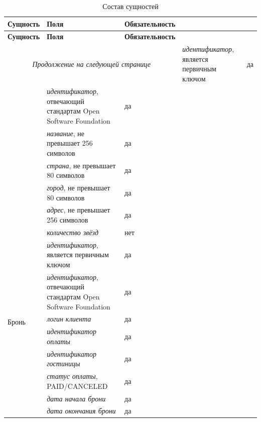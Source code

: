 \begin{longtable}{| p{4cm} | p{8.3cm} | p{3.6cm} |}
	\caption{Состав сущностей}
	\label{tbl:db_reservation} \\
	\hline
	
	\textbf{Сущность} & \textbf{Поля} & \textbf{Обязательность} \\
	\hline
	\endfirsthead
	
	\hline
	\textbf{Сущность} & \textbf{Поля} & \textbf{Обязательность} \\
	\hline
	\endhead
	
	\hline
	\multicolumn{3}{c}{\textit{Продолжение на следующей странице}}
	\endfoot
	\hline
	\endlastfoot
	
	\multirow{7}{*}{Гостиница}
	& 
	\textit{идентификатор}, является первичным ключом
	& 
	да \\
	\cline{2-3}
	
	&
	\textit{идентификатор}, отвечающий стандартам Open Software Foundation
	&
	да \\
	\cline{2-3}
	
	&
	\textit{название}, не превышает 256 символов
	&
	да \\
	\cline{2-3}
	
	&
	\textit{страна}, не превышает 80 символов
	&
	да \\
	\cline{2-3}
	
	&
	\textit{город}, не превышает 80 символов
	&
	да \\
	\cline{2-3}
	
	&
	\textit{адрес}, не превышает 256 символов
	&
	да \\
	\cline{2-3}
	
	&
	\textit{количество звёзд}
	&
	нет \\
	\hline
	
	\multirow{7}{*}{Бронь}
	& 
	\textit{идентификатор}, является первичным ключом
	& 
	да \\
	\cline{2-3}
	
	&
	\textit{идентификатор}, отвечающий стандартам Open Software Foundation
	&
	да \\
	\cline{2-3}
	
	&
	\textit{логин клиента}
	&
	да \\
	\cline{2-3}
	
	&
	\textit{идентификатор оплаты}
	&
	да \\
	\cline{2-3}
	
	&
	\textit{идентификатор гостиницы}
	&
	да \\
	\cline{2-3}
	
	&
	\textit{статус оплаты}, PAID/CANCELED
	&
	да \\
	\cline{2-3}
	
	&
	\textit{дата начала брони}
	&
	да \\
	\cline{2-3}
	
	&
	\textit{дата окончания брони}
	&
	да \\
	\cline{2-3}
\end{longtable}

